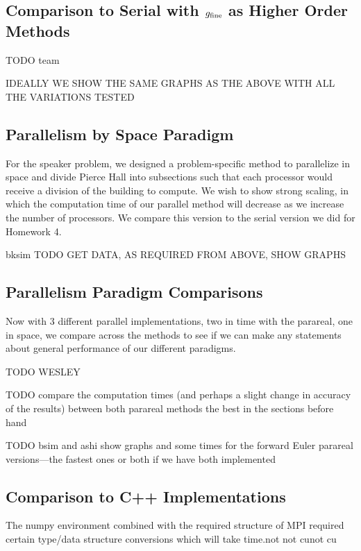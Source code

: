\documentclass[letterpaper,12pt]{article}
\begin{document}
\subsection{Comparison to Serial with $g_{\textnormal{fine}}$ as Higher Order Methods}

TODO team

IDEALLY WE SHOW THE SAME GRAPHS AS THE ABOVE WITH ALL THE VARIATIONS TESTED

\subsection{Parallelism by Space Paradigm}

For the speaker problem, we designed a problem-specific method to parallelize in space and divide Pierce Hall into subsections such that each processor would receive a division of the building to compute. We wish to show strong scaling, in which the computation time of our parallel method will decrease as we increase the number of processors. We compare this version to the serial version we did for Homework 4.

bksim TODO GET DATA, AS REQUIRED FROM ABOVE, SHOW GRAPHS

\subsection{Parallelism Paradigm Comparisons}

Now with 3 different parallel implementations, two in time with the parareal, one in space, we compare across the methods to see if we can make any statements about general performance of our different paradigms.

TODO WESLEY

TODO compare the computation times (and perhaps a slight change in accuracy of the results) between both parareal methods the best in the sections before hand

TODO bsim and ashi show graphs and some times for the forward Euler parareal
versions---the fastest ones or both if we have both implemented

\subsection{Comparison to C++ Implementations}

The numpy environment combined with the required structure of MPI required
certain type/data structure conversions which will take time.not not cunot cu
\end{document}
